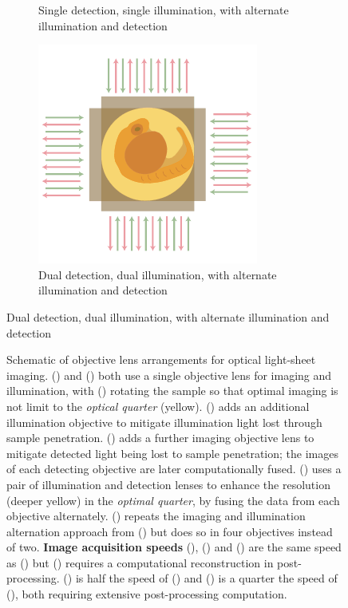 \begin{figure}
\begin{subfigure}[t]{0.4\textwidth}
        \caption{Single detection, single illumination, with alternate illumination and detection~\cite{kumar_dual-view_2014}}
        \label{fig:depth/di_spim}
    \end{subfigure}\hspace{0.07\textwidth}
    \begin{subfigure}[t]{0.4\textwidth}
        \centering
        \includegraphics{depth/muvi}
        \caption{Dual detection, dual illumination, with alternate illumination and detection}
        \label{fig:depth/muvi}
    \end{subfigure}
\end{figure}
\begin{figure}
    \ContinuedFloat
    \caption[Schematic of objective lens arrangements for optical \gls{light-sheet} imaging]{Schematic of objective lens arrangements for optical \gls{light-sheet} imaging.
    () and () both use a single objective lens for imaging and illumination, with () rotating the sample so that optimal imaging is not limit to the \emph{optical quarter} (yellow).
    () adds an additional illumination objective to mitigate illumination light lost through sample penetration.
    () adds a further imaging objective lens to mitigate detected light being lost to sample penetration; the images of each detecting objective are later computationally fused.
    () uses a pair of illumination and detection lenses to enhance the resolution (deeper yellow) in the \emph{optimal quarter}, by fusing the data from each objective alternately.
    () repeats the imaging and illumination alternation approach from () but does so in four objectives instead of two.
    \textbf{Image acquisition speeds}
    (), () and () are the same speed as () but () requires a computational reconstruction in post-processing.
    () is half the speed of () and () is a quarter the speed of (), both requiring extensive post-processing computation.
    }
    \label{fig:spim_optimal_imaging}
\end{figure}


